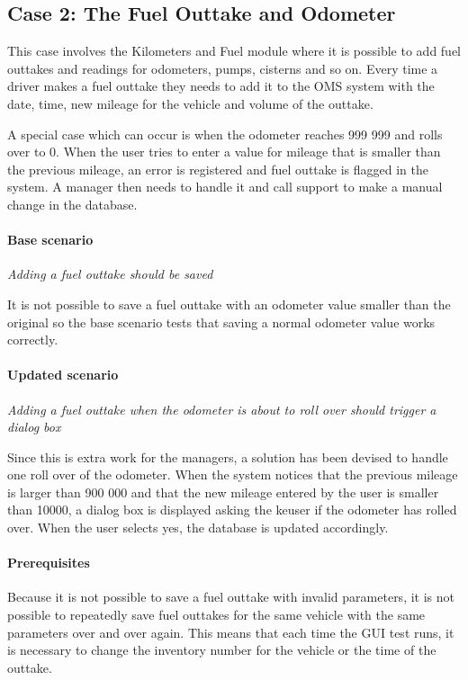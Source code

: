 \documentclass{article}
\begin{document}
			\subsection{Case 2: The Fuel Outtake and Odometer}

			This case involves the Kilometers and Fuel module where it is possible to add fuel outtakes and readings for odometers, pumps, cisterns and so on. Every time a driver makes a fuel outtake they needs to add it to the OMS system with the date, time, new mileage for the vehicle and volume of the outtake.

			A special case which can occur is when the odometer reaches 999 999 and rolls over to 0. When the user tries to enter a value for mileage that is smaller than the previous mileage, an error is registered and fuel outtake is flagged in the system. A manager then needs to handle it and call support to make a manual change in the database.

			\paragraph{Base scenario}
			  {\em Adding a fuel outtake should be saved}

			It is not possible to save a fuel outtake with an odometer value smaller than the original so the base scenario tests that saving a normal odometer value works correctly. 

			\paragraph{Updated scenario}
			  {\em Adding a fuel outtake when the odometer is about to roll over should trigger a dialog box}

			Since this is extra work for the managers, a solution has been devised to handle one roll over of the odometer. When the system notices that the previous mileage is larger than 900 000 and that the new mileage entered by the user is smaller than 10000, a dialog box is displayed asking the keuser if the odometer has rolled over. When the user selects yes, the database is updated accordingly.

			\paragraph{Prerequisites}
			Because it is not possible to save a fuel outtake with invalid parameters, it is not possible to repeatedly save fuel outtakes for the same vehicle with the same parameters over and over again.
			This means that each time the GUI test runs, it is necessary to change the inventory number for the vehicle or the time of the outtake.
			
\end{document}
